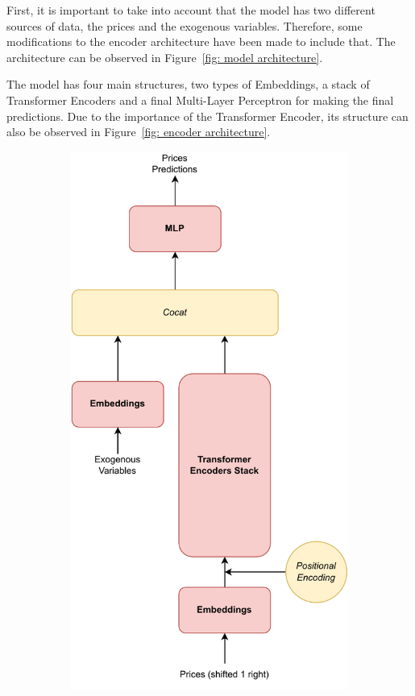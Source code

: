 \documentclass[journal]{IEEEtran}
\begin{document}
First, it is important to take into account that the model has two different sources of data, the prices and the exogenous variables. Therefore, some modifications to the encoder architecture have been made to include that. The architecture can be observed in Figure~\ref{fig: model architecture}.

The model has four main structures, two types of Embeddings, a stack of Transformer Encoders and a final Multi-Layer Perceptron for making the final predictions. Due to the importance of the Transformer Encoder, its structure can also be observed in Figure~\ref{fig: encoder architecture}.

\begin{figure}
  \centering
  \begin{subfigure}{0.49\linewidth}
      \centering
      \includegraphics[width=\linewidth, height=2\linewidth]{images/model.pdf}

\end{subfigure}
\end{figure}
\end{document}
